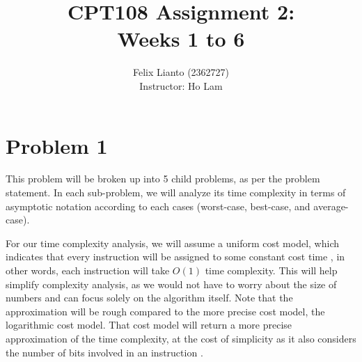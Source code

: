 \documentclass{report}
\begin{document}
	\def\lvld{1.2}                  %
	\pgfmathsetmacro\shft{-6*\lvld} %
	
	\title{\textbf{CPT108 Assignment 2:} \\ Weeks 1 to 6}
	\author{Felix Lianto (2362727)\\
		[1cm]{Instructor: Ho Lam}}
	\maketitle
	
\section{Problem 1}
This problem will be broken up into 5 child problems, as per the problem statement. In each sub-problem, we will analyze its time complexity in terms of asymptotic notation according to each cases (worst-case, best-case, and average-case).

For our time complexity analysis, we will assume a uniform cost model, which indicates that every instruction will be assigned to some constant cost time \autocite{hromkovicTheoreticalComputerScience2003}, in other words, each instruction will take $O(1)$ time complexity. This will help simplify complexity analysis, as we would not have to worry about the size of numbers and can focus solely on the algorithm itself. Note that the approximation will be rough compared to the more precise cost model, the logarithmic cost model. That cost model will return a more precise approximation of the time complexity, at the cost of simplicity as it also considers the number of bits involved in an instruction \autocite{hromkovicTheoreticalComputerScience2003}.
\end{document}
